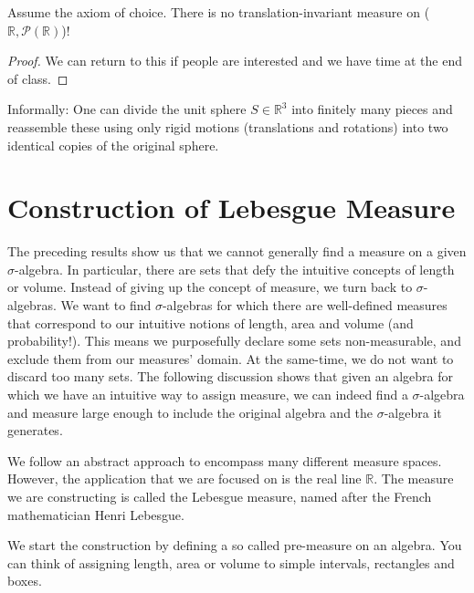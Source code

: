 \documentclass[11pt]{scrartcl}
\begin{document}
\begin{theorem}
Assume the axiom of choice. There is no translation-invariant measure on ($\mathbb{R},\mathcal{P}(\mathbb{R})$)!
\end{theorem}
\begin{proof} 
We can return to this if people are interested and we have time at the end of class.
\end{proof}

\begin{theorem}
Informally: One can divide the unit sphere  $S \in \mathbb{R}^3$ into finitely many pieces and reassemble these using only rigid motions (translations and rotations) into two identical copies of the original sphere. 
\end{theorem}








\section{Construction of Lebesgue Measure}
The preceding results show us that we cannot generally find a measure on a given $\sigma$-algebra. In particular, there are sets that defy the intuitive concepts of length or volume. Instead of giving up the concept of measure, we turn back to $\sigma$-algebras. We want to find $\sigma$-algebras for which there are well-defined measures that correspond to our intuitive notions of length, area and volume (and probability!). This means we purposefully declare some sets non-measurable, and exclude them from our measures' domain. At the same-time, we do not want to discard too many sets. 
The following discussion shows that given an algebra for which we have an intuitive way to assign measure, we can indeed find a $\sigma$-algebra and measure large enough to include the original algebra and the $\sigma$-algebra it generates. 

We follow an abstract approach to encompass many different measure spaces. However, the application that we are focused on is the real line $\mathbb{R}$. The measure we are constructing is called the Lebesgue measure, named after the French mathematician Henri Lebesgue. 

We start the construction by defining a so called pre-measure on an algebra. You can think of assigning length, area or volume to simple intervals, rectangles and boxes. 
\end{document}
